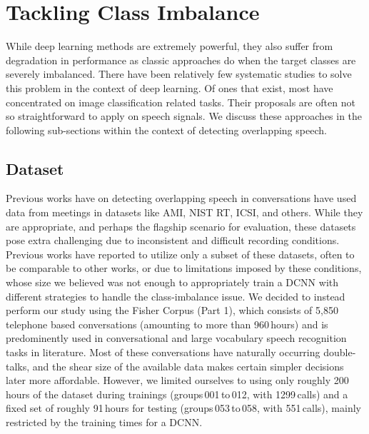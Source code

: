 \documentclass[a4paper]{article}
\begin{document}
\section{Tackling Class Imbalance}
While deep learning methods are extremely powerful,
they also suffer from degradation in performance as classic approaches do when the target classes are severely imbalanced.
There have been relatively few systematic studies to solve this problem in the context of deep learning.
Of ones that exist, most have concentrated on image classification related tasks.  %
Their proposals are often not so straightforward to apply on speech signals.
We discuss these approaches in the following sub-sections within the context of detecting overlapping speech.

\subsection{Dataset}
Previous works have on detecting overlapping speech in conversations have used data from meetings in datasets like AMI, NIST RT, ICSI, and others.  %
While they are appropriate, and perhaps the flagship scenario for evaluation,
these datasets pose extra challenging due to inconsistent and difficult recording conditions.
Previous works have reported to utilize only a subset of these datasets,
often to be comparable to other works,  %
or due to limitations imposed by these conditions,
whose size we believed was not enough to appropriately train a DCNN with different strategies to handle the class-imbalance issue.
We decided to instead perform our study using the Fisher Corpus (Part 1),  %
which consists of 5,850 telephone based conversations (amounting to more than 960\,hours) and is predominently used in conversational and large vocabulary speech recognition tasks in literature.  %
Most of these conversations have naturally occurring double-talks,
and the shear size of the available data makes certain simpler decisions later more affordable.
However, we limited ourselves to using only roughly 200\,hours of the dataset during trainings
(groups\,001\,to\,012, with 1299\,calls) and a fixed set of roughly 91\,hours for testing
(groups\,053\,to\,058, with 551\,calls),
mainly restricted by the training times for a DCNN.
\end{document}
